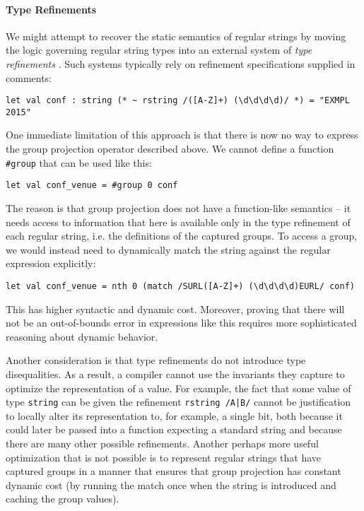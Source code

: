 \paragraph{Type Refinements}
We might attempt to recover the static semantics of regular strings by moving the logic governing regular string types into an external system of \emph{type refinements} \cite{Freeman91}. %
Such  systems typically rely on refinement specifications supplied in comments:
\begin{lstlisting}[numbers=none]
let val conf : string (* ~ rstring /([A-Z]+) (\d\d\d\d)/ *) = "EXMPL 2015"
\end{lstlisting}
One immediate limitation of this approach is that there is now no way to express the group projection operator described above. We cannot define a function \lstinline{#group} that can be used like this:
\begin{lstlisting}[numbers=none]
let val conf_venue = #group 0 conf
\end{lstlisting}
The reason is that group projection does not have a function-like semantics -- it needs access to information that here is  available only in the type refinement of each regular string, i.e. the definitions of the captured groups. To access a group, we would instead need to dynamically match the string against the regular expression explicitly:

\begin{lstlisting}[numbers=none]
let val conf_venue = nth 0 (match /SURL([A-Z]+) (\d\d\d\d)EURL/ conf)
\end{lstlisting}
This has higher syntactic and dynamic cost. Moreover, proving that there will not be an out-of-bounds error in expressions like this requires more sophisticated reasoning about dynamic behavior.

Another consideration is that type refinements do not introduce type disequalities. As a result, a compiler cannot use the invariants they capture to optimize the representation of a value. For example, the fact that some value of type \lstinline{string} can be given the refinement \lstinline{rstring /A|B/} cannot be justification to locally alter its representation to, for example, a single bit, both because it could later be passed into a function expecting a standard string and because there are many other possible refinements. Another perhaps more useful optimization that is not possible is to represent regular strings that have captured groups in a manner that ensures that group projection has constant dynamic cost (by running the match once when the string is introduced and caching the group values). 

